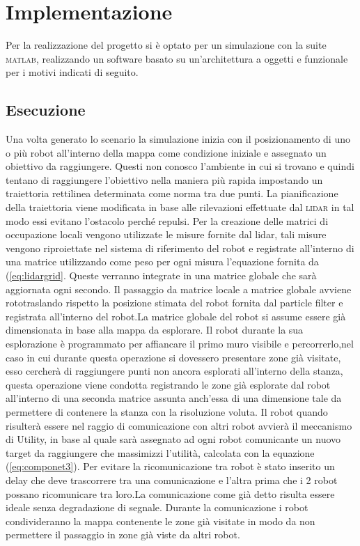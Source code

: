 \section{Implementazione}
\label{sec:implementazione}
Per la realizzazione del progetto si è optato per un simulazione con la suite
\textsc{matlab}, realizzando un software basato su un'architettura a oggetti
e funzionale per i motivi indicati di seguito.


\subsection{Esecuzione}
Una volta generato lo scenario la simulazione inizia con il posizionamento di
uno o più robot all'interno della mappa come condizione iniziale e assegnato un
obiettivo da raggiungere.
Questi non conosco l'ambiente in cui si trovano e quindi tentano di raggiungere
l'obiettivo nella maniera più rapida impostando un traiettoria rettilinea
determinata come norma tra due punti.
La pianificazione della traiettoria viene modificata in base alle rilevazioni
effettuate dal \textsc{lidar} in tal modo essi evitano l'ostacolo perché repulsi.
Per la creazione delle matrici di occupazione locali vengono utilizzate le misure
fornite dal lidar, tali misure vengono riproiettate nel sistema di riferimento del robot
e registrate all'interno di una matrice utilizzando come peso per ogni misura l'equazione
fornita da (\ref{eq:lidargrid}.
Queste verranno integrate in una matrice globale che sarà aggiornata ogni secondo. Il
passaggio da matrice locale a matrice globale avviene rototraslando rispetto la posizione
stimata del robot fornita dal particle filter e registrata all'interno del robot.La matrice
globale del robot si assume essere già dimensionata in base alla mappa da esplorare.
Il robot durante la sua esplorazione è programmato per affiancare il primo muro visibile e
percorrerlo,nel caso in cui durante questa operazione si dovessero presentare zone già visitate,
esso cercherà di raggiungere punti non ancora esplorati all'interno della stanza, questa operazione
viene condotta registrando le zone già esplorate dal robot all'interno di una seconda matrice assunta
anch'essa di una dimensione tale da permettere di contenere la stanza con la risoluzione voluta.
Il robot quando risulterà essere nel raggio di comunicazione con altri robot avvierà il meccanismo di Utility,
in base al quale sarà assegnato ad ogni robot comunicante un nuovo target da raggiungere che massimizzi
l'utilità, calcolata con la equazione (\ref{eq:componet3}). Per evitare la ricomunicazione tra robot è stato
inserito un delay che deve trascorrere tra una comunicazione e l'altra prima che i 2 robot possano ricomunicare
tra loro.La comunicazione come già detto risulta essere ideale senza degradazione di segnale.
Durante la comunicazione i robot condivideranno la mappa contenente le zone già visitate in modo da
non permettere il passaggio in zone già viste da altri robot.
%


